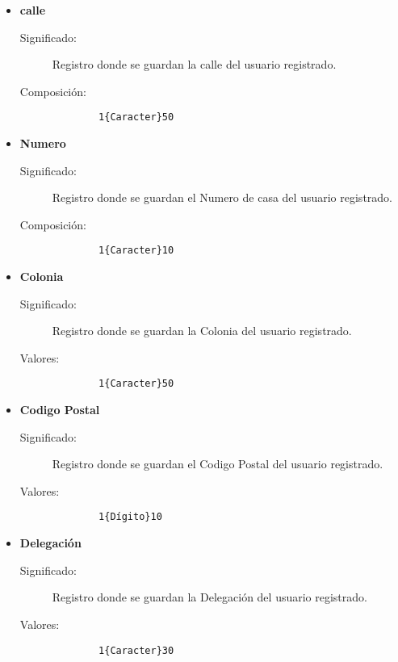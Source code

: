 \begin{itemize}
      \item \textbf{calle}\label{dd:calleC}
    \begin{description}
      \item [Significado:] Registro donde se guardan la calle del usuario registrado.
      \item [Composición:]{\begin{lstlisting}
        1{Caracter}50\end{lstlisting}}
    \end{description}

  \item \textbf{Numero}\label{dd:noC}
    \begin{description}
      \item [Significado:] Registro donde se guardan el Numero de casa del usuario registrado.
      \item [Composición:]{\begin{lstlisting}
        1{Caracter}10\end{lstlisting}}
    \end{description}

  \item \textbf{Colonia}\label{dd:coloniaC}
    \begin{description}
      \item [Significado:] Registro donde se guardan la Colonia del usuario registrado.
      \item [Valores:]{\begin{lstlisting}
        1{Caracter}50\end{lstlisting}}
    \end{description}

  \item \textbf{Codigo Postal}\label{dd:cpC}
    \begin{description}
      \item [Significado:] Registro donde se guardan el Codigo Postal del usuario registrado.
      \item [Valores:]{\begin{lstlisting}
        1{Dígito}10\end{lstlisting}}
    \end{description}

  \item \textbf{Delegación}\label{dd:delegC}
    \begin{description}
      \item [Significado:] Registro donde se guardan la Delegación del usuario registrado.
      \item [Valores:]{\begin{lstlisting}
        1{Caracter}30\end{lstlisting}}
    \end{description}


\end{itemize}
